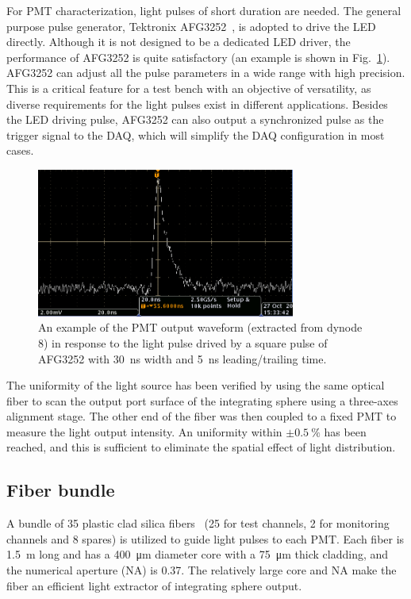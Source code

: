 \documentclass{nst}
\begin{document}
For PMT characterization, light pulses of short duration are needed.
The general purpose pulse generator, Tektronix AFG3252~\cite{afg3252}, is adopted to drive the LED directly.
Although it is not designed to be a dedicated LED driver, the performance of AFG3252 is quite satisfactory (an example is shown in Fig.~\ref{fig:FIG4}).
AFG3252 can adjust all the pulse parameters in a wide range with high precision. This is a critical feature for a test bench with an objective of versatility, as diverse requirements for the light pulses exist in different applications. 
Besides the LED driving pulse, AFG3252 can also output a synchronized pulse as the trigger signal to the DAQ, which will simplify the DAQ configuration in most cases. 

\begin{figure}[!htb]
	\centering
	\includegraphics[width=85mm]{FIG4.jpg}
	\caption{An example of the PMT output waveform (extracted from dynode 8) in response to the light pulse drived by a square pulse of AFG3252 with \SI{30}{\nano\second} width and \SI{5}{\nano\second} leading/trailing time.}
	\label{fig:FIG4}
\end{figure} 

The uniformity of the light source has been verified by using the same optical fiber to scan the output port surface of the integrating sphere using a three-axes alignment stage. The other end of the fiber was then coupled to a fixed PMT to measure the light output intensity.
An uniformity within $\pm\SI{0.5}{\percent}$ has been reached, and this is sufficient to eliminate the spatial effect of light distribution.

\subsection{Fiber bundle}
\label{sec:fiber_bundle}

A bundle of 35 plastic clad silica fibers~\cite{optical_fibre} (25 for test channels, 2 for monitoring channels and 8 spares) is utilized to guide light pulses to each PMT.	Each fiber is \SI{1.5}{\meter} long and has a \SI{400}{\micro\meter} diameter core with a \SI{75}{\micro\meter} thick cladding, and the numerical aperture (NA) is 0.37.
The relatively large core and NA make the fiber an efficient light extractor of integrating sphere output. 
\end{document}
